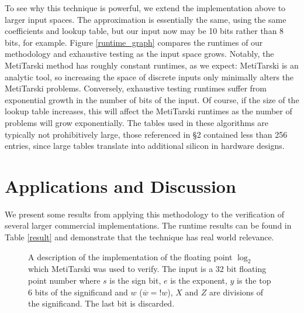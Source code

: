 \documentclass{fac}
\begin{document}
To see why this technique is powerful, we extend the implementation above to larger input spaces. The approximation is essentially the same, using the same coefficients and lookup table, but our input now may be 10 bits rather than 8 bits, for example. Figure \ref{runtime_graph} compares the runtimes of our methodology and exhaustive testing as the input space grows. Notably, the MetiTarski method has roughly constant runtimes, as we expect: MetiTarski is an analytic tool, so increasing the space of discrete inputs only minimally alters the MetiTarski problems. Conversely, exhaustive testing runtimes suffer from exponential growth in the number of bits of the input. Of course, if the size of the lookup table increases, this will affect the MetiTarski runtimes as the number of problems will grow exponentially. The tables used in these algorithms are typically not prohibitively large, those referenced in \S 2 contained less than 256 entries, since large tables translate into additional silicon in hardware designs.


\section{Applications and Discussion}
\label{Apps}
We present some results from applying this methodology to the verification of several larger commercial implementations. The runtime results can be found in Table \ref{result} and demonstrate that the technique has real world relevance.

\begin{figure}
\centering

\caption{A description of the implementation of the floating point $\log_2$ which MetiTarski was used to verify. The input is a 32 bit floating point number where $s$ is the sign bit, $e$ is the exponent, $y$ is the top 6 bits of the significand and $w$ ($\overline{w} = !w$), $X$ and $Z$ are divisions of the significand. The last bit is discarded.\label{block_diagram}}
\end{figure}
\end{document}

